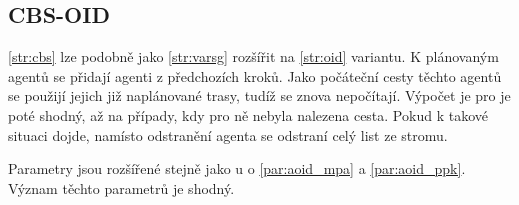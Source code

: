 \subsection{CBS-OID}\label{subsec:cbsoid}

\ref{str:cbs} lze podobně jako \ref{str:varsg} rozšířit na \ref{str:oid} variantu.
K plánovaným agentů se přidají agenti z předchozích kroků.
Jako počáteční cesty těchto agentů se použijí jejich již naplánované trasy, tudíž se znova nepočítají.
Výpočet je pro je poté shodný, až na případy, kdy pro ně nebyla nalezena cesta.
Pokud k takové situaci dojde, namísto odstranění agenta se odstraní celý list ze stromu.

Parametry jsou rozšířené stejně jako u  o \ref{par:aoid_mpa} a \ref{par:aoid_ppk}.
Význam těchto parametrů je shodný.
